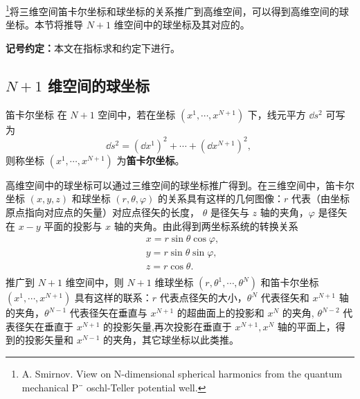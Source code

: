 
\footnote{A. Smirnov. View on N-dimensional spherical harmonics from
 the quantum mechanical P¨ oschl-Teller potential
 well.
 }将三维空间笛卡尔坐标和球坐标的关系推广到高维空间，可以得到高维空间的球坐标。本节将推导 $N+1$ 维空间中的球坐标及其对应的。

\textbf{记号约定：}本文在指标求和约定下进行。

\subsection{$N+1$ 维空间的球坐标}
\begin{definition}{笛卡尔坐标}\label{def_nDSM_1}
在 $N+1$ 空间中，若在坐标 $(x^1,\cdots,x^{N+1})$ 下，线元平方 $\dd s^2$ 可写为
\begin{equation}\label{eq_nDSM_2}
\dd s^2=(\dd x^1)^2+\cdots+(\dd x^{N+1})^2,~
\end{equation}
 则称坐标 $(x^1,\cdots,x^{N+1})$ 为\textbf{笛卡尔坐标}。
\end{definition}

高维空间中的球坐标可以通过三维空间的球坐标推广得到。在三维空间中，笛卡尔坐标 $(x,y,z)$ 和球坐标 $(r,\theta,\varphi)$ 的关系具有这样的几何图像：$r$ 代表（由坐标原点指向对应点的矢量）对应点径矢的长度， $\theta$ 是径矢与 $z$ 轴的夹角，$\varphi$ 是径矢在 $x-y$ 平面的投影与 $x$ 轴的夹角。由此得到两坐标系统的转换关系
\begin{equation}
\begin{aligned}
&x=r\sin\theta\cos\varphi,\\
&y=r\sin\theta\sin\varphi,\\
&z=r\cos\theta.\\
\end{aligned}~
\end{equation}
推广到 $N+1$ 维空间中，则 $N+1$ 维球坐标 $(r,\theta^1,\cdots,\theta^{N})$ 和笛卡尔坐标 $(x^1,\cdots,x^{N+1})$ 具有这样的联系：$r$ 代表点径矢的大小，$\theta^{N}$ 代表径矢和 $x^{N+1}$ 轴的夹角，$\theta^{N-1}$ 代表径矢在垂直与 $x^{N+1}$ 的超曲面上的投影和 $x^{N}$ 的夹角, $\theta^{N-2}$ 代表径矢在垂直于 $x^{N+1}$ 的投影矢量,再次投影在垂直于 $x^{N+1},x^{N}$ 轴的平面上，得到的投影矢量和 $x^{N-1}$ 的夹角，其它球坐标以此类推。

